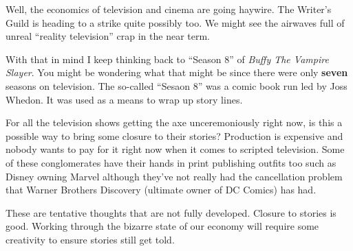 Well, the economics of television and cinema are going haywire. The
Writer's Guild is heading to a strike quite possibly too. We might see
the airwaves full of unreal ``reality television'' crap in the near
term.

With that in mind I keep thinking back to ``Season 8'' of \emph{Buffy
The Vampire Slayer}. You might be wondering what that might be since
there were only \textbf{seven} seasons on television. The so-called
``Sesaon 8'' was a comic book run led by Joss Whedon. It was used as a
means to wrap up story lines.

For all the television shows getting the axe unceremoniously right now,
is this a possible way to bring some closure to their stories?
Production is expensive and nobody wants to pay for it right now when it
comes to scripted television. Some of these conglomerates have their
hands in print publishing outfits too such as Disney owning Marvel
although they've not really had the cancellation problem that Warner
Brothers Discovery (ultimate owner of DC Comics) has had.

These are tentative thoughts that are not fully developed. Closure to
stories is good. Working through the bizarre state of our economy will
require some creativity to ensure stories still get told.
